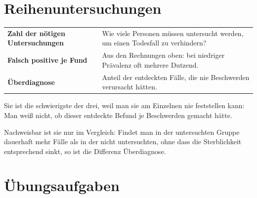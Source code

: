 \section{Reihenuntersuchungen}

\begin{warnung}
\begin{center}
{\small
\renewcommand{\arraystretch}{1.52}
\begin{tabular}{@{}P{2.8cm}P{5.8cm}@{}}
\toprule
\textbf{Zahl der nötigen Untersuchungen} & Wie viele Personen müssen untersucht werden, um einen Todesfall zu verhindern?\\
\textbf{Falsch positive je Fund} & Aus den Rechnungen oben: bei niedriger Prävalenz oft mehrere Dutzend.\\
\textbf{Überdiagnose} & Anteil der entdeckten Fälle, die nie Beschwerden verursacht hätten.\\
\bottomrule
\end{tabular}}
\end{center}

Sie ist die schwierigste der drei, weil man sie am Einzelnen nie feststellen kann: Man weiß nicht, ob dieser entdeckte Befund je Beschwerden gemacht hätte.

Nachweisbar ist sie nur im Vergleich: Findet man in der untersuchten Gruppe dauerhaft mehr Fälle als in der nicht untersuchten, ohne dass die Sterblichkeit entsprechend sinkt, so ist die Differenz Überdiagnose.

\begin{center}
\begin{minipage}{0.88\textwidth}
\end{minipage}
\end{center}
\end{warnung}

\section{Übungsaufgaben}

